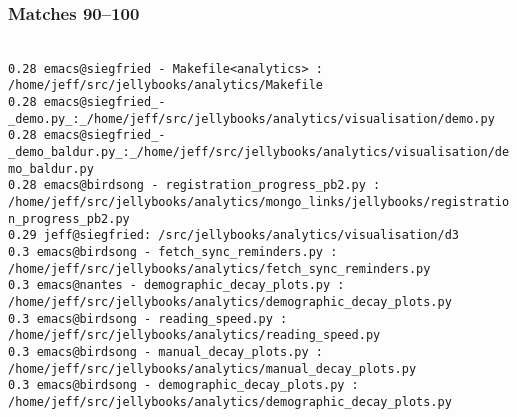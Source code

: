 \begin{frame}
\frametitle{Matches 90--100}
\tt\tiny
{}\\[2mm]
\hspace{2mm}0.28 emacs@siegfried - Makefile<analytics> : /home/jeff/src/jellybooks/analytics/Makefile\\
\hspace{2mm}0.28 emacs@siegfried\_-\_demo.py\_:\_/home/jeff/src/jellybooks/analytics/visualisation/demo.py\\
\hspace{2mm}0.28 emacs@siegfried\_-\_demo\_baldur.py\_:\_/home/jeff/src/jellybooks/analytics/visualisation/demo\_baldur.py\\
\hspace{2mm}0.28 emacs@birdsong - registration\_progress\_pb2.py : /home/jeff/src/jellybooks/analytics/mongo\_links/jellybooks/registration\_progress\_pb2.py\\
\hspace{2mm}0.29 jeff@siegfried:~/src/jellybooks/analytics/visualisation/d3\\
\hspace{2mm}0.3 emacs@birdsong - fetch\_sync\_reminders.py : /home/jeff/src/jellybooks/analytics/fetch\_sync\_reminders.py\\
\hspace{2mm}0.3 emacs@nantes - demographic\_decay\_plots.py : /home/jeff/src/jellybooks/analytics/demographic\_decay\_plots.py\\
\hspace{2mm}0.3 emacs@birdsong - reading\_speed.py : /home/jeff/src/jellybooks/analytics/reading\_speed.py\\
\hspace{2mm}0.3 emacs@birdsong - manual\_decay\_plots.py : /home/jeff/src/jellybooks/analytics/manual\_decay\_plots.py\\
\hspace{2mm}0.3 emacs@birdsong - demographic\_decay\_plots.py : /home/jeff/src/jellybooks/analytics/demographic\_decay\_plots.py
\end{frame}

